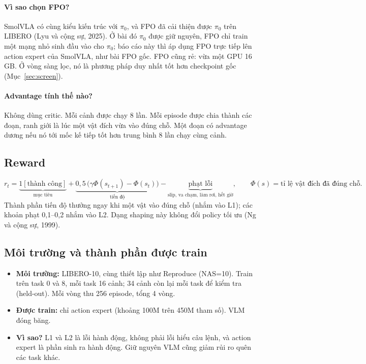 \documentclass[10pt,a4paper]{article}
\begin{document}
\paragraph{Vì sao chọn FPO?} SmolVLA có cùng kiểu kiến trúc với $\pi_0$, và FPO đã cải thiện được $\pi_0$ trên LIBERO
(Lyu và cộng sự, 2025). Ở bài đó $\pi_0$ được giữ nguyên, FPO chỉ train một mạng nhỏ sinh đầu vào cho $\pi_0$; báo cáo này
thì áp dụng FPO trực tiếp lên action expert của SmolVLA, như bài FPO gốc. FPO cũng rẻ: vừa một GPU 16\,GB. Ở vòng sàng lọc, nó là phương pháp duy nhất tốt hơn checkpoint gốc
(Mục~\ref{sec:screen}).

\paragraph{Advantage tính thế nào?} Không dùng critic. Mỗi cảnh được chạy 8 lần. Mỗi episode được chia thành các đoạn,
ranh giới là lúc một vật đích vừa vào đúng chỗ. Một đoạn có advantage dương nếu nó tới mốc kế tiếp tốt hơn trung bình 8
lần chạy cùng cảnh.

\subsection{Reward}\label{sec:reward}
\begin{equation}
r_t=\underbrace{1[\text{thành công}]}_{\text{mục tiêu}}
+\underbrace{0{,}5\,\big(\gamma\Phi(s_{t+1})-\Phi(s_t)\big)}_{\text{tiến độ}}
-\underbrace{\text{phạt lỗi}}_{\text{slip, va chạm, làm rơi, hết giờ}},
\qquad \Phi(s)=\text{tỉ lệ vật đích đã đúng chỗ}.
\end{equation}
Thành phần tiến độ thưởng ngay khi một vật vào đúng chỗ (nhắm vào L1); các khoản phạt 0{,}1--0{,}2 nhắm vào L2. Dạng
shaping này không đổi policy tối ưu (Ng và cộng sự, 1999).

\subsection{Môi trường và thành phần được train}\label{sec:env}
\begin{itemize}
\item \textbf{Môi trường:} LIBERO-10, cùng thiết lập như Reproduce (NAS=10). Train trên task 0 và 8, mỗi task 16 cảnh;
34 cảnh còn lại mỗi task để kiểm tra (held-out). Mỗi vòng thu 256 episode, tổng 4 vòng.
\item \textbf{Được train:} chỉ action expert (khoảng 100M trên 450M tham số). VLM đóng băng.
\item \textbf{Vì sao?} L1 và L2 là lỗi hành động, không phải lỗi hiểu câu lệnh, và action expert là phần sinh ra
hành động. Giữ nguyên VLM cũng giảm rủi ro quên các task khác.
\end{itemize}
\end{document}
